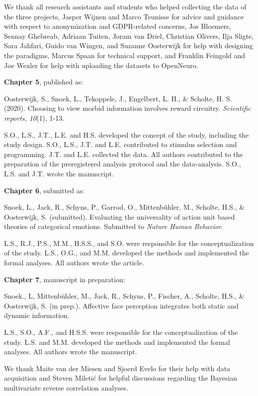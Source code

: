 \documentclass[11pt,american,]{memoir} %
\begin{document}
We thank all research assistants and students who helped collecting the data of the three projects, Jasper Wijnen and Marco Teunisse for advice and guidance with respect to anonymization and GDPR-related concerns, Jos Bloemers, Sennay Ghebreab, Adriaan Tuiten, Joram van Driel, Christian Olivers, Ilja Sligte, Sara Jahfari, Guido van Wingen, and Suzanne Oosterwijk for help with designing the paradigms, Marcus Spaan for technical support, and Franklin Feingold and Joe Wexler for help with uploading the datasets to OpenNeuro.

\textbf{Chapter 5}, published as:

Oosterwijk, S., Snoek, L., Tekoppele, J., Engelbert, L. H., \& Scholte, H. S. (2020). Choosing to view morbid information involves reward circuitry. \emph{Scientific reports, 10}(1), 1-13.

S.O., L.S., J.T., L.E. and H.S. developed the concept of the study, including the study design. S.O., L.S., J.T. and L.E. contributed to stimulus selection and programming. J.T. and L.E. collected the data. All authors contributed to the preparation of the preregistered analysis protocol and the data-analysis. S.O., L.S. and J.T. wrote the manuscript.

\textbf{Chapter 6}, submitted as:

Snoek, L., Jack, R., Schyns, P., Garrod, O., Mittenbühler, M., Scholte, H.S., \& Oosterwijk, S. (submitted). Evaluating the universality of action unit based theories of categorical emotions. Submitted to \emph{Nature Human Behavior}.

L.S., R.J., P.S., M.M., H.S.S., and S.O. were responsible for the conceptualization of the study. L.S., O.G., and M.M. developed the methods and implemented the formal analyses. All authors wrote the article.

\textbf{Chapter 7}, manuscript in preparation:

Snoek., L, Mittenbühler, M., Jack, R., Schyns, P., Fischer, A., Scholte, H.S., \& Oosterwijk, S. (in prep.). Affective face perception integrates both static and dynamic information.

L.S., S.O., A.F., and H.S.S. were responsible for the conceptualization of the study. L.S. and M.M. developed the methods and implemented the formal analyses. All authors wrote the manuscript.

We thank Maite van der Miesen and Sjoerd Evelo for their help with data acquisition and Steven Miletić for helpful discussions regarding the Bayesian multivariate reverse correlation analyses.
\end{document}

